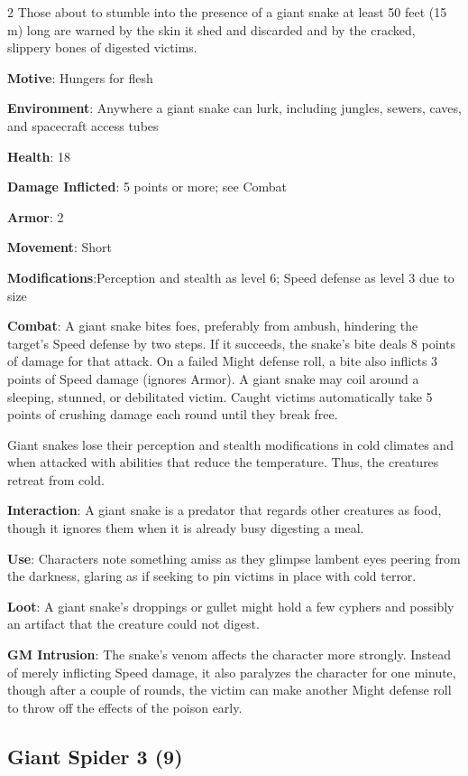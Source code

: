 \begin{multicols}{2}
Those about to stumble into the presence of a giant snake at least 50 feet (15 m) long are warned by the skin it shed and discarded and by the cracked, slippery bones of digested victims. 

\textbf{Motive}: Hungers for flesh

\textbf{Environment}: Anywhere a giant snake can lurk, including jungles, sewers, caves, and spacecraft access tubes

\textbf{Health}: 18

\textbf{Damage Inflicted}: 5 points or more; see Combat

\textbf{Armor}: 2

\textbf{Movement}: Short

\textbf{Modifications}:Perception and stealth as level 6; Speed defense as level 3 due to size

\textbf{Combat}: A giant snake bites foes, preferably from ambush, hindering the target’s Speed defense by two steps. If it succeeds, the snake’s bite deals 8 points of damage for that attack. On a failed Might defense roll, a bite also inflicts 3 points of Speed damage (ignores Armor). A giant snake may coil around a sleeping, stunned, or debilitated victim. Caught victims automatically take 5 points of crushing damage each round until they break free.

Giant snakes lose their perception and stealth modifications in cold climates and when attacked with abilities that reduce the temperature. Thus, the creatures retreat from cold.

\textbf{Interaction}: A giant snake is a predator that regards other creatures as food, though it ignores them when it is already busy digesting a meal.

\textbf{Use}: Characters note something amiss as they glimpse lambent eyes peering from the darkness, glaring as if seeking to pin victims in place with cold terror.

\textbf{Loot}: A giant snake’s droppings or gullet might hold a few cyphers and possibly an artifact that the creature could not digest.

\textbf{GM Intrusion}: The snake’s venom affects the character more strongly. Instead of merely inflicting Speed damage, it also paralyzes the character for one minute, though after a couple of rounds, the victim can make another Might defense roll to throw off the effects of the poison early.

\subsection{Giant Spider	3 (9)}


\end{multicols}
